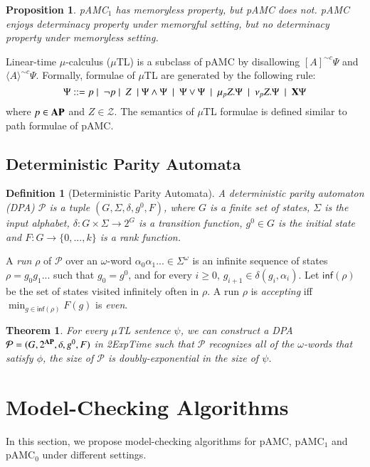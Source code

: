 \documentclass[letterpaper]{article}
\newcommand{\AP}{{\bf AP}}
\newcommand{\calZ}{\mathcal{Z}}
\newcommand{\PA}{\mathcal{P}}
\newcommand{\pamc}{{pAMC}\xspace}
\newcommand{\pamcs}{{pAMC$_0$}\xspace}
\newcommand{\pamcc}{{pAMC$_1$}\xspace}
\newcommand{\inff}{\textsf{inf}}
\newcommand{\opX}{{\bf X}}
\newcommand{\opA}[1]{\langle{#1}\rangle}
\newcommand{\opUA}[1]{[{#1}]}
\newtheorem{definition}{Definition}
\newtheorem{theorem}{Theorem}
\newtheorem{proposition}{Proposition}
\begin{document}
\begin{proposition}
\pamcc has memoryless property, but \pamc does not.
\pamc enjoys determinacy property under memoryful setting, but no determinacy property under memoryless setting.
\end{proposition}



Linear-time $\mu$-calculus ($\mu$TL) is a subclass of \pamc by disallowing $\opUA{A}^{\sim c} \Psi$ and $\opA{A}^{\sim c} \Psi$.
Formally, formulae of $\mu$TL are generated by the following rule:
 \[\Psi::=p\mid  \ \neg p \mid  \ Z  \ \mid \Psi \wedge \Psi  \ \mid  \ \Psi \vee \Psi \ \mid \  \mu_p Z. \Psi  \ \mid \  \nu_p Z. \Psi \ \mid \ \opX \Psi\]
where $p\in\AP$ and $Z\in \calZ$.
The semantics of $\mu$TL formulae is defined similar to path formulae of \pamc.

\subsection{Deterministic Parity Automata}
\begin{definition}[Deterministic Parity Automata]
A  \emph{deterministic parity automaton} (DPA) $\PA$ is a tuple $(G,\Sigma,\delta, g^0, F)$, where
$G$ is a finite set of states, $\Sigma$ is the input alphabet, $\delta: G\times\Sigma \rightarrow 2^G$
is a transition function, $g^0\in G$ is the initial state and $F:G\rightarrow\{0,...,k\}$ is a rank function.
\end{definition}

A \emph{run} $\rho$ of $\PA$ over an $\omega$-word $\alpha_0\alpha_1...\in \Sigma^\omega$ is an infinite sequence of states $\rho=g_0g_1...$
such that $g_0=g^0$, and for every $i\geq 0$, $g_{i+1}\in \delta(g_i,\alpha_i)$.
Let $\inff(\rho)$ be the set of states visited infinitely often in $\rho$.
A run $\rho$  is \emph{accepting} iff $\min_{g\in\inff(\rho)} F(g)$ is \emph{even}.


\begin{theorem}
\label{thm-ltl2pa}\cite{Dax06,Pit07}
For every $\mu$TL sentence $\psi$, we can construct a DPA $\PA=(G,2^\AP,\delta, g^0, F)$ in {\sc 2ExpTime} such that $\PA$ recognizes all of the $\omega$-words that satisfy $\phi$,
the size of $\PA$ is doubly-exponential in the size of $\psi$.
\end{theorem}


\section{Model-Checking Algorithms}
\label{sec:mc}
In this section, we propose model-checking algorithms for \pamc, \pamcc and \pamcs under different settings.
\end{document}
